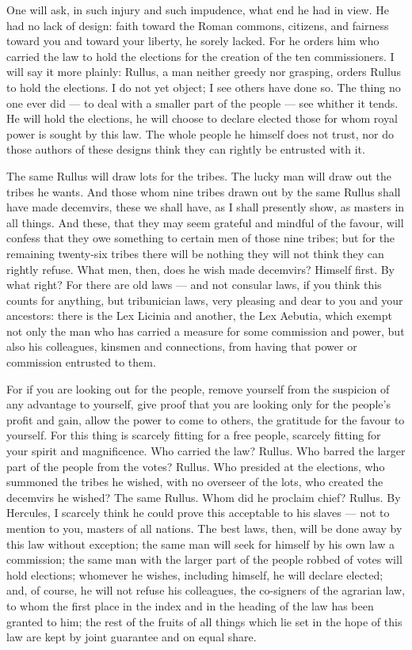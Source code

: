  One will ask, in such injury and such impudence, what end he had in view. He had no lack of design: faith toward the Roman commons, citizens, and fairness toward you and toward your liberty, he sorely lacked. For he orders him who carried the law to hold the elections for the creation of the ten commissioners. I will say it more plainly: Rullus, a man neither greedy nor grasping, orders Rullus to hold the elections. I do not yet object; I see others have done so. The thing no one ever did --- to deal with a smaller part of the people --- see whither it tends. He will hold the elections, he will choose to declare elected those for whom royal power is sought by this law. The whole people he himself does not trust, nor do those authors of these designs think they can rightly be entrusted with it.

 The same Rullus will draw lots for the tribes. The lucky man will draw out the tribes he wants. And those whom nine tribes drawn out by the same Rullus shall have made decemvirs, these we shall have, as I shall presently show, as masters in all things. And these, that they may seem grateful and mindful of the favour, will confess that they owe something to certain men of those nine tribes; but for the remaining twenty-six tribes there will be nothing they will not think they can rightly refuse. What men, then, does he wish made decemvirs? Himself first. By what right? For there are old laws --- and not consular laws, if you think this counts for anything, but tribunician laws, very pleasing and dear to you and your ancestors: there is the Lex Licinia and another, the Lex Aebutia, which exempt not only the man who has carried a measure for some commission and power, but also his colleagues, kinsmen and connections, from having that power or commission entrusted to them.

 For if you are looking out for the people, remove yourself from the suspicion of any advantage to yourself, give proof that you are looking only for the people's profit and gain, allow the power to come to others, the gratitude for the favour to yourself. For this thing is scarcely fitting for a free people, scarcely fitting for your spirit and magnificence. Who carried the law? Rullus. Who barred the larger part of the people from the votes? Rullus. Who presided at the elections, who summoned the tribes he wished, with no overseer of the lots, who created the decemvirs he wished? The same Rullus. Whom did he proclaim chief? Rullus. By Hercules, I scarcely think he could prove this acceptable to his slaves --- not to mention to you, masters of all nations. The best laws, then, will be done away by this law without exception; the same man will seek for himself by his own law a commission; the same man with the larger part of the people robbed of votes will hold elections; whomever he wishes, including himself, he will declare elected; and, of course, he will not refuse his colleagues, the co-signers of the agrarian law, to whom the first place in the index and in the heading of the law has been granted to him; the rest of the fruits of all things which lie set in the hope of this law are kept by joint guarantee and on equal share.

